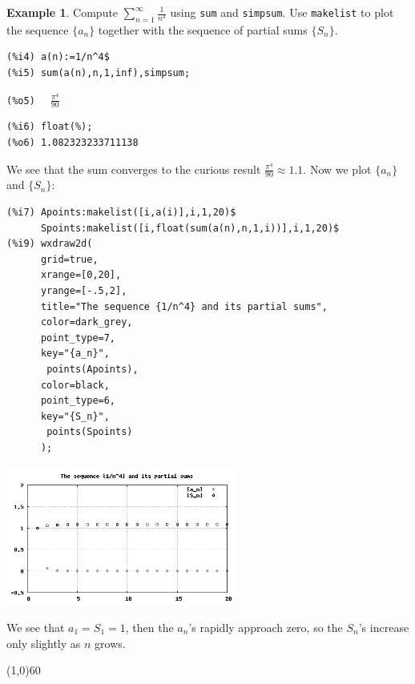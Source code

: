 \documentclass[10.5pt,twoside]{report}
\theoremstyle{definition}
\newtheorem{exmp}{Example}[section]
\begin{document}
\begin{exmp} Compute $ \sum_{n=1}^{\infty} \frac{1}{n^4}$ using \verb|sum| and \verb|simpsum|.  Use \verb|makelist| to plot the sequence $\lbrace a_n \rbrace$ together with the sequence of partial sums $\lbrace S_n \rbrace$.

\begin{verbatim}
(%i4) a(n):=1/n^4$
(%i5) sum(a(n),n,1,inf),simpsum;
\end{verbatim}
\verb|(%o5)  | $ \frac{\pi^4}{90}$

\begin{verbatim}
(%i6) float(%);
(%o6) 1.082323233711138
\end{verbatim}

We see that the sum converges to the curious result $\frac{\pi^4}{90} \approx 1.1$.  Now we plot $\lbrace a_n \rbrace$ and $\lbrace S_n \rbrace$:

\begin{verbatim}
(%i7) Apoints:makelist([i,a(i)],i,1,20)$
      Spoints:makelist([i,float(sum(a(n),n,1,i))],i,1,20)$
(%i9) wxdraw2d(
      grid=true,
      xrange=[0,20],
      yrange=[-.5,2],
      title="The sequence {1/n^4} and its partial sums",
      color=dark_grey,
      point_type=7,
      key="{a_n}",
       points(Apoints),
      color=black,
      point_type=6,
      key="{S_n}",
       points(Spoints)
      );
\end{verbatim}

\includegraphics[width=3in]{example_6_2_2_1}

We see that $a_1=S_1=1$, then the $a_n$'s rapidly approach zero, so the $S_n$'s increase only slightly as $n$ grows.

\end{exmp}

\line(1,0){60}
\linethickness{0.5mm}
\pagebreak
\end{document}

